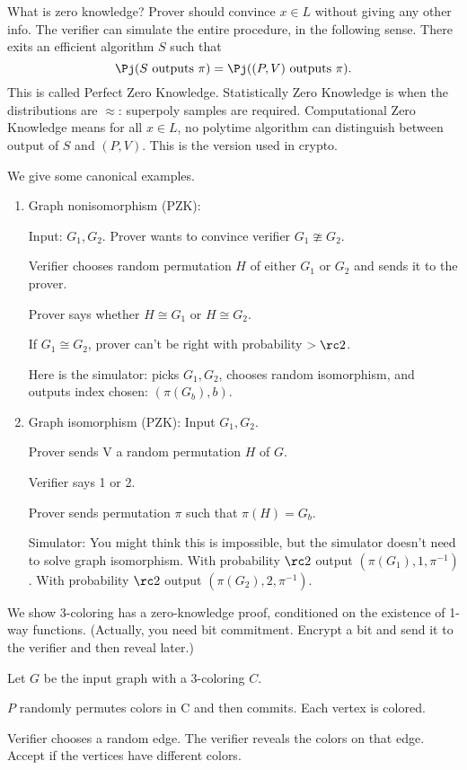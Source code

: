 What is zero knowledge?
Prover should convince $x\in L$ without giving any other info. The verifier can simulate the entire procedure, in the following sense. There exits an efficient algorithm $S$ such that 
\[
\Pj(S\text{ outputs }\pi) =\Pj((P,V)\text{ outputs }\pi).
\]
This is called Perfect Zero Knowledge.
Statistically Zero Knowledge is when the distributions are $\approx$: superpoly samples are required.
Computational Zero Knowledge means for all $x\in L$, no polytime algorithm can distinguish between output of $S$ and $(P,V)$.
This is the version used in crypto.

We give some canonical examples.
\begin{enumerate}
\item
Graph nonisomorphism (PZK):

Input: $G_1,G_2$. Prover wants to convince verifier $G_1\ncong G_2$.

Verifier chooses random permutation $H$ of either $G_1$ or $G_2$ and sends it to the prover.

Prover says whether $H\cong G_1$ or $H\cong G_2$.

If $G_1\cong G_2$, prover can't be right with probability $>\rc2$.

Here is the simulator: picks $G_1,G_2$, chooses random isomorphism, and outputs index chosen: $(\pi(G_b),b)$. 
\item
Graph isomorphism (PZK): Input $G_1,G_2$. 

Prover sends V a random permutation $H$ of $G$. 

Verifier says 1 or 2.

Prover sends permutation $\pi$ such that $\pi(H)=G_b$.

Simulator: You might think this is impossible, but the simulator doesn't need to solve graph isomorphism. With probability $\rc2$ output $(\pi(G_1),1,\pi^{-1})$. With probability $\rc2$ output $(\pi(G_2),2,\pi^{-1})$.
\end{enumerate}
We show 3-coloring has a zero-knowledge proof, conditioned on the existence of 1-way functions. (Actually, you need bit commitment. Encrypt a bit and send it to the verifier and then reveal later.)

Let $G$ be the input graph with a 3-coloring $C$. 

$P$ randomly permutes colors in C and then commits. Each vertex is colored.

Verifier chooses a random edge. The verifier reveals the colors on that edge. Accept if the vertices have different colors.

